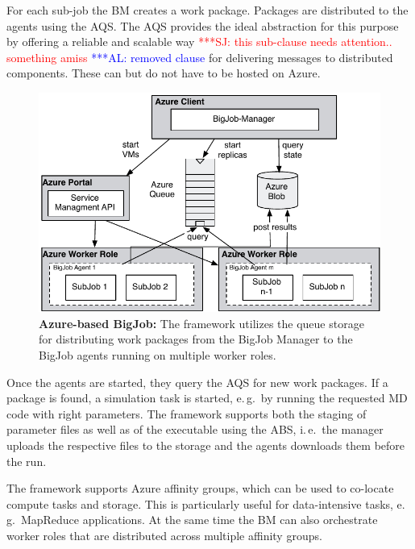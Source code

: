 \documentclass[conference,final]{IEEEtran}
\newcommand{\up}{\vspace*{-1em}}
\newcommand{\alnote}[1]{ {\textcolor{blue} { ***AL: #1 }}}
\newcommand{\jhanote}[1]{ {\textcolor{red} { ***SJ: #1 }}}
\newcommand{\alnote}[1]{}
\newcommand{\jhanote}[1]{}
\begin{document}
For each sub-job the BM creates a work package. Packages are
distributed to the agents using the AQS. The AQS provides the ideal
abstraction for this purpose by offering a reliable and scalable way
\jhanote{this  sub-clause needs attention.. something amiss} \alnote{removed
clause}%
for delivering messages to distributed components. These can but do not have to be
hosted on Azure.


\begin{figure}
    \centering
    \includegraphics[width=.4\textwidth]{figures/bigjob_azure}
    \caption{\textbf{Azure-based BigJob:} The framework
      utilizes the queue storage for distributing work
      packages from the BigJob Manager to the
      BigJob agents running on multiple worker roles.}
    \label{fig:figures_bigjob_azure}
    \up\up
\end{figure}

Once the agents are started, they query the AQS for new work
packages.  If a package is found, a simulation task is started, e.\,g.\
by running the requested MD code with right parameters. The framework
supports both the staging of parameter files as well as of the
executable using the ABS, i.\,e.\ the manager
uploads the respective files to the storage and the agents downloads
them before the run.

The framework supports Azure affinity groups, which
can be used to co-locate compute tasks and storage. This is
particularly useful for data-intensive tasks, e.\,g.\ MapReduce
applications. At the same time the BM can also orchestrate worker roles that
are distributed across multiple affinity groups.


\end{document}
